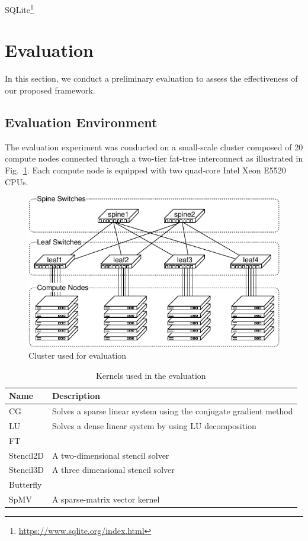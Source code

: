 \documentclass[graybox]{svmult}
\begin{document}
SQLite\footnote{\url{https://www.sqlite.org/index.html}}

\section{Evaluation}\label{kt:sec:iv}

In this section, we conduct a preliminary evaluation to assess the
effectiveness of our proposed framework.

\subsection{Evaluation Environment}

The evaluation experiment was conducted on a small-scale cluster composed of
20 compute nodes connected through a two-tier fat-tree interconnect as
illustrated in Fig.~\ref{kt:fig:cluster}. Each compute node is equipped with
two quad-core Intel Xeon E5520 CPUs.

\begin{figure}
    \centering
    \includegraphics{evaluation_cluster}
    \caption{Cluster used for evaluation}%
    \label{kt:fig:cluster}
\end{figure}

\begin{table}
\caption{Kernels used in the evaluation}%
\label{kt:tbl:openflow-messages}
\begin{tabular}{ll}
\toprule
Name      & Description \\ \midrule
CG        & Solves a sparse linear system using the conjugate gradient method \\
LU        & Solves a dense linear system by using LU decomposition            \\
FT        &             \\
Stencil2D & A two-dimensional stencil solver           \\
Stencil3D & A three dimensional stencil solver            \\
Butterfly &             \\
SpMV      & A sparse-matrix vector kernel            \\ \bottomrule
\end{tabular}
\end{table}
\end{document}
